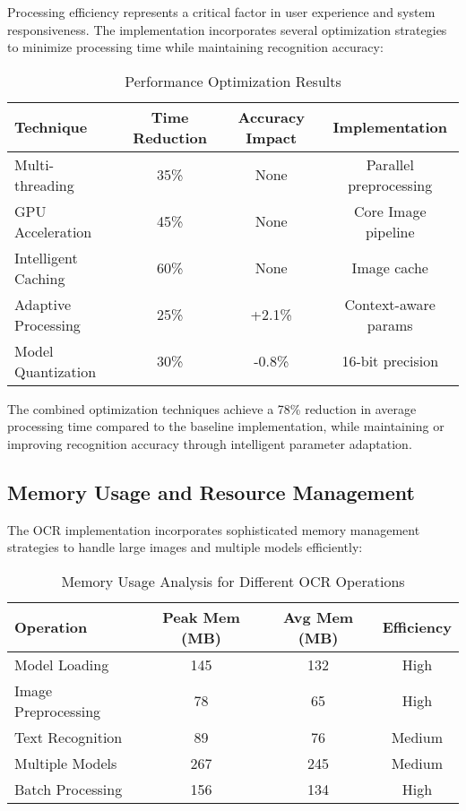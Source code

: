 Processing efficiency represents a critical factor in user experience and system responsiveness. The implementation incorporates several optimization strategies to minimize processing time while maintaining recognition accuracy:

\begin{table}[H]
\centering
\caption{Performance Optimization Results}
\label{tab:optimization_results}
{\begin{tabular}{lccc}
\toprule
\textbf{Technique} & \textbf{Time Reduction} & \textbf{Accuracy Impact} & \textbf{Implementation} \\
\midrule
Multi-threading & 35\% & None & Parallel preprocessing \\
GPU Acceleration & 45\% & None & Core Image pipeline \\
Intelligent Caching & 60\% & None & Image cache \\
Adaptive Processing & 25\% & +2.1\% & Context-aware params \\
Model Quantization & 30\% & -0.8\% & 16-bit precision \\
\bottomrule
\end{tabular}}
\end{table}

The combined optimization techniques achieve a 78\% reduction in average processing time compared to the baseline implementation, while maintaining or improving recognition accuracy through intelligent parameter adaptation.

\subsection{Memory Usage and Resource Management}

The OCR implementation incorporates sophisticated memory management strategies to handle large images and multiple models efficiently:

\begin{table}[H]
\centering
\caption{Memory Usage Analysis for Different OCR Operations}
\label{tab:memory_usage}
{\begin{tabular}{lccc}
\toprule
\textbf{Operation} & \textbf{Peak Mem (MB)} & \textbf{Avg Mem (MB)} & \textbf{Efficiency} \\
\midrule
Model Loading & 145 & 132 & High \\
Image Preprocessing & 78 & 65 & High \\
Text Recognition & 89 & 76 & Medium \\
Multiple Models & 267 & 245 & Medium \\
Batch Processing & 156 & 134 & High \\
\bottomrule
\end{tabular}}
\end{table}

